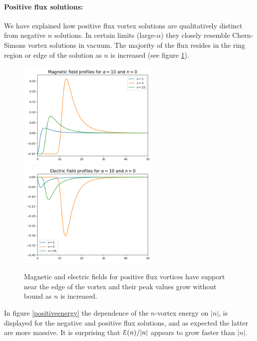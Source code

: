 \paragraph{Positive flux solutions:}
We have explained how positive flux vortex solutions are qualitatively distinct from negative $n$ solutions. In certain limits (large-$\alpha$) they closely resemble  Chern-Simons vortex solutions in vacuum. 
The majority of the flux resides in the ring region or edge of the solution as $n$ is increased (see figure \ref{positiveprofile}).
\begin{figure}[h]
\begin{center}
 \includegraphics[width=2.7in]{Chapter_2_Folder_1912.11321/figures/B_alpha_10_positive_final.png} \includegraphics[width=2.7in]{Chapter_2_Folder_1912.11321/figures/E_alpha_10_positive_final.png}
     \caption{{Magnetic and electric fields for positive flux vortices have support near the edge of the vortex and their peak values grow without bound as $n$ is increased.}} \label{positiveprofile}
    \end{center}
\end{figure} 
In figure \ref{positiveenergy} the dependence of the $n$-vortex energy on $|n|$, is displayed for the negative and positive flux solutions, and as expected the latter are more massive.  It is surprising  that ${\cal E }(n)/|n|$ appears to grow faster than $|n|$.
